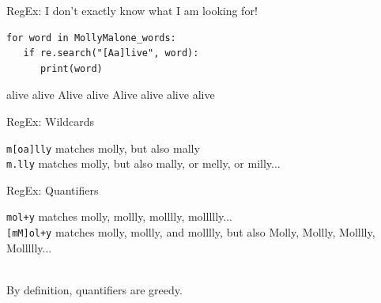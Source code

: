 \documentclass[handout]{beamer}
\begin{document}
\begin{frame}[fragile]{RegEx: I don't exactly know what I am looking for!}

\begin{lstlisting}
for word in MollyMalone_words:
   if re.search("[Aa]live", word):
      print(word)
\end{lstlisting}
	
\begin{lstlistingoutput}
alive
alive
Alive
alive
Alive
alive
alive
alive
\end{lstlistingoutput}
	
	
\end{frame}



\begin{frame}[fragile]{RegEx: Wildcards}

\lstinline{m[oa]lly} matches molly, but also mally \\
\lstinline{m.lly} matches molly, but also mally, or melly, or milly... 



	
	
\end{frame}


\begin{frame}[fragile]{RegEx: Quantifiers}
	
\lstinline{mol+y} matches molly, mollly, molllly, mollllly...  \\
\lstinline{[mM]ol+y} matches molly, mollly, and molllly, but also Molly, Mollly, Molllly, Mollllly...  \\\

By definition, quantifiers are greedy.
	
	
	
\end{frame}
\end{document}
